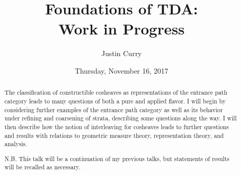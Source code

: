 \documentclass{UAmathtalk}
\author{Justin Curry}
\title{Foundations of TDA:\\Work in Progress}
\date{Thursday, November 16, 2017}
\begin{document}
\maketitle

\begin{abstract}
The classification of constructible cosheaves as representations of the entrance path category leads to many questions of both a pure and applied flavor. I will begin by considering further examples of the entrance path category as well as its behavior under refining and coarsening of strata, describing some questions along the way. I will then describe how the notion of interleaving for cosheaves leads to further questions and results with relations to geometric measure theory, representation theory, and analysis.
\bigskip

\noindent N.B. This talk will be a continuation of my previous talks, but statements of results will be recalled as necessary.
\end{abstract}
\end{document}
